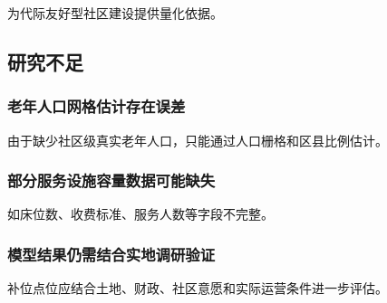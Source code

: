 为代际友好型社区建设提供量化依据。

\subsection{研究不足}

\subsubsection{老年人口网格估计存在误差}

由于缺少社区级真实老年人口，只能通过人口栅格和区县比例估计。

\subsubsection{部分服务设施容量数据可能缺失}

如床位数、收费标准、服务人数等字段不完整。

\subsubsection{模型结果仍需结合实地调研验证}

补位点位应结合土地、财政、社区意愿和实际运营条件进一步评估。


